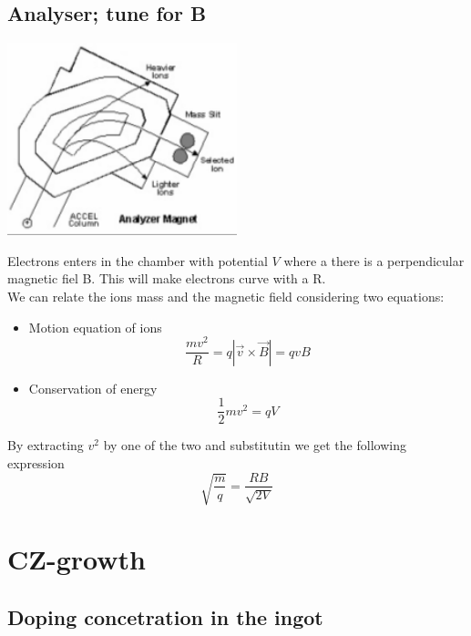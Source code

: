 
\subsection{Analyser; tune for B}

\centering
\includegraphics[width=0.5\textwidth]{B-curve.png}\\
\raggedright

Electrons enters in the chamber with potential $V$ where a there is a perpendicular magnetic fiel B. This will make electrons curve with a R.\\
We can relate the ions mass and the magnetic field considering two equations:\begin{itemize}
\item Motion equation of ions
\begin{equation}
\frac{mv^2}{R}=q|\vec{v}\times \vec{B}|=qvB
\end{equation}
\item Conservation of energy
\begin{equation}
\frac{1}{2}mv^2=qV
\end{equation}
\end{itemize}
By extracting $v^2$ by one of the two and substitutin we get the following expression
\begin{equation}
\sqrt{\frac{m}{q}}=\frac{RB}{\sqrt{2V}}
\end{equation}


\section{CZ-growth}

\subsection{Doping concetration in the ingot}

